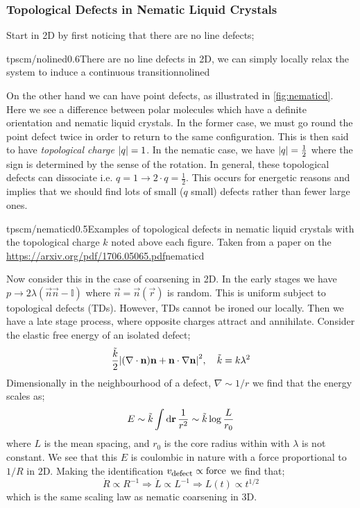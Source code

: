 \subsubsection{Topological Defects in Nematic Liquid Crystals}
Start in 2D by first noticing that there are no line defects;
\begin{mygraphic}{tpscm/nolined}{0.6}{There are no line defects in 2D, we can simply locally relax the system to induce a continuous transition}{nolined}\end{mygraphic}
On the other hand we can have point defects, as illustrated in \autoref{fig:nematicd}. Here we see a difference between polar molecules which have a definite orientation and nematic liquid crystals. In the former case, we must go round the point defect twice in order to return to the same configuration. This is then said to have \emph{topological charge} $\abs{q} = 1$. In the nematic case, we have $\abs{q} = \tfrac{1}{2}$ where the sign is determined by the sense of the rotation. In general, these topological defects can dissociate i.e. $q = 1 \rightarrow 2 \cdot q = \tfrac{1}{2}$. This occurs for energetic reasons and implies that we should find lots of small ($q$ small) defects rather than fewer large ones.
\begin{mygraphic}{tpscm/nematicd}{0.5}{Examples of topological defects in nematic liquid crystals with the topological charge $k$ noted above each figure. Taken from a paper on the \href{Orientation of topological defects in 2D nematic liquid crystals}{https://arxiv.org/pdf/1706.05065.pdf}}{nematicd}\end{mygraphic}
Now consider this in the case of coarsening in 2D. In the early stages we have $p \rightarrow 2\lambda (\vec{n}\vec{n} - \mathbb{I})$ where $\vec{n} = \vec{n}(\vec{r})$ is random. This is uniform subject to topological defects (TDs). However, TDs cannot be ironed our locally. Then we have a late stage process, where opposite charges attract and annihilate. Consider the elastic free energy of an isolated defect;
\begin{equation*}
\frac{\tilde{k}}{2}\abs{(\nabla \cdot \vec{n})\vec{n} + \vec{n}\cdot \nabla \vec{n}}^2, \quad \tilde{k} = k\lambda^2
\end{equation*}
Dimensionally in the neighbourhood of a defect, $\nabla \sim 1/r$ we find that the energy scales as;
\begin{equation*}
E \sim \tilde{k} \int{\text{d}\mathbf{r} \,\frac{1}{r^2}} \sim \tilde{k}\log\frac{L}{r_0}
\end{equation*}
where $L$ is the mean spacing, and $r_0$ is the core radius within with $\lambda$ is not constant. We see that this $E$ is coulombic in nature with a force proportional to $1/R$ in $2$D. Making the identification $v_{\text{\footnotesize{defect}}} \propto \text{force}$ we find that;
\begin{equation*}
\dot{R} \propto R^{-1} \Rightarrow \dot{L} \propto L^{-1} \Rightarrow L(t) \propto t^{1/2}
\end{equation*}
which is the same scaling law as nematic coarsening in 3D.
